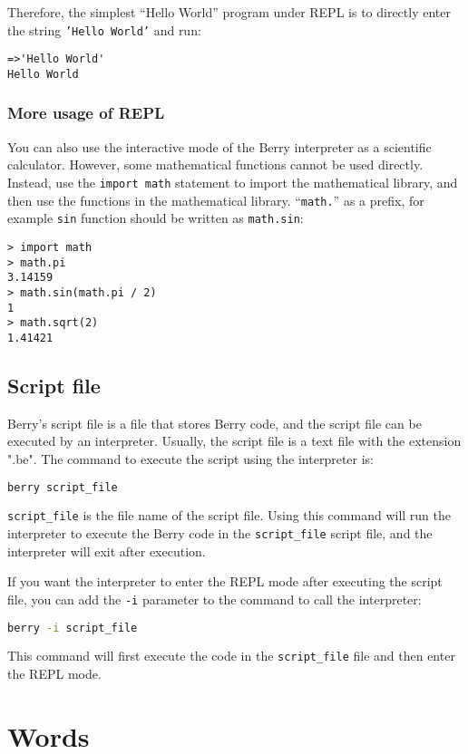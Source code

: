 Therefore, the simplest “Hello World” program under REPL is to directly enter the string \texttt{'Hello World'} and run:
\begin{lstlisting}[language=berry, numbers=none]
=>'Hello World'
Hello World
\end{lstlisting}

\subsubsection {More usage of REPL}

You can also use the interactive mode of the Berry interpreter as a scientific calculator. However, some mathematical functions cannot be used directly. Instead, use the \texttt{import math} statement to import the mathematical library, and then use the functions in the mathematical library. ``\texttt{math.}'' as a prefix, for example \texttt{sin} function should be written as \texttt{math.sin}:
\begin{lstlisting}[language=berry, numbers=none]
> import math
> math.pi
3.14159
> math.sin(math.pi / 2)
1
> math.sqrt(2)
1.41421
\end{lstlisting}

\subsection {Script file}

Berry's script file is a file that stores Berry code, and the script file can be executed by an interpreter. Usually, the script file is a text file with the extension ".be". The command to execute the script using the interpreter is:
\begin{lstlisting}[language=bash, numbers=none]
berry script_file
\end{lstlisting}
\texttt{script\_file} is the file name of the script file. Using this command will run the interpreter to execute the Berry code in the \texttt{script\_file} script file, and the interpreter will exit after execution.

If you want the interpreter to enter the REPL mode after executing the script file, you can add the \texttt{-i} parameter to the command to call the interpreter:
\begin{lstlisting}[language=bash, numbers=none]
berry -i script_file
\end{lstlisting}
This command will first execute the code in the \texttt{script\_file} file and then enter the REPL mode.

\section {Words}

